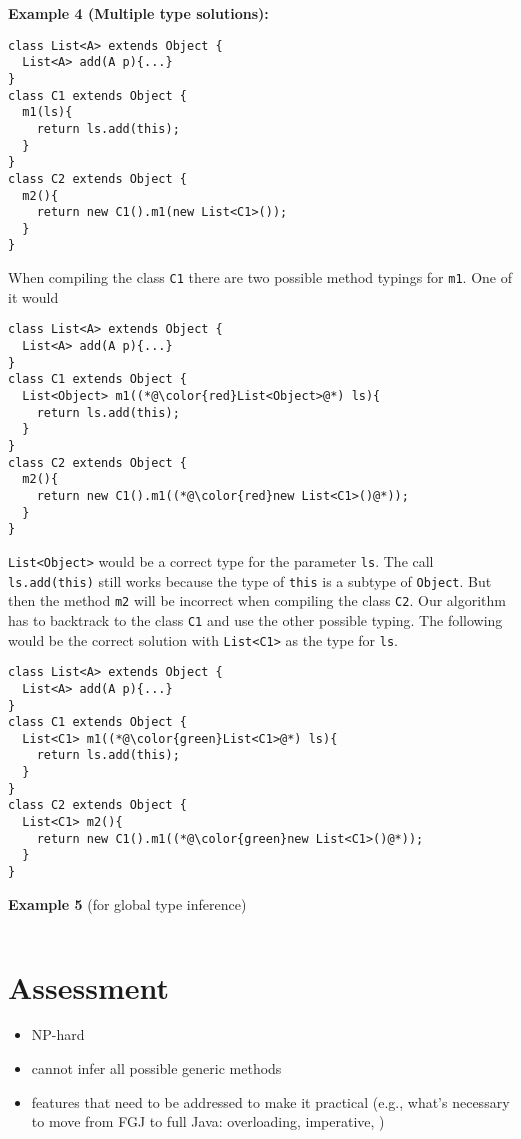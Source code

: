 \documentclass[runningheads]{llncs}
\begin{document}
\textbf{Example 4 (Multiple type solutions):}
\begin{lstlisting}
class List<A> extends Object {
  List<A> add(A p){...}
}
class C1 extends Object {
  m1(ls){
    return ls.add(this);
  }
}
class C2 extends Object {
  m2(){
    return new C1().m1(new List<C1>());
  }
}
\end{lstlisting}
When compiling the class \texttt{C1} there are two possible method typings for \texttt{m1}.
One of it would 
\begin{lstlisting}
class List<A> extends Object {
  List<A> add(A p){...}
}
class C1 extends Object {
  List<Object> m1((*@\color{red}List<Object>@*) ls){
    return ls.add(this);
  }
}
class C2 extends Object {
  m2(){
    return new C1().m1((*@\color{red}new List<C1>()@*));
  }
}
\end{lstlisting}
\texttt{List<Object>} would be a correct type for the parameter \texttt{ls}.
The call \texttt{ls.add(this)} still works because the type of \texttt{this} is a subtype of \texttt{Object}.
But then the method \texttt{m2} will be incorrect when compiling the class \texttt{C2}.
Our algorithm has to backtrack to the class \texttt{C1} and use the other possible typing.
The following would be the correct solution with \texttt{List<C1>} as the type for \texttt{ls}.
\begin{lstlisting}
class List<A> extends Object {
  List<A> add(A p){...}
}
class C1 extends Object {
  List<C1> m1((*@\color{green}List<C1>@*) ls){
    return ls.add(this);
  }
}
class C2 extends Object {
  List<C1> m2(){
    return new C1().m1((*@\color{green}new List<C1>()@*));
  }
}
\end{lstlisting}

\textbf{Example 5} (for global type inference)
\begin{lstlisting}

\end{lstlisting}

\section{Assessment}
\label{sec:assessment}

\begin{itemize}
\item NP-hard 
\item cannot infer all possible generic methods
\item features that need to be addressed to make it practical (e.g.,
  what's necessary to move from FGJ to full Java: overloading,
  imperative, )
\end{itemize}
\end{document}
